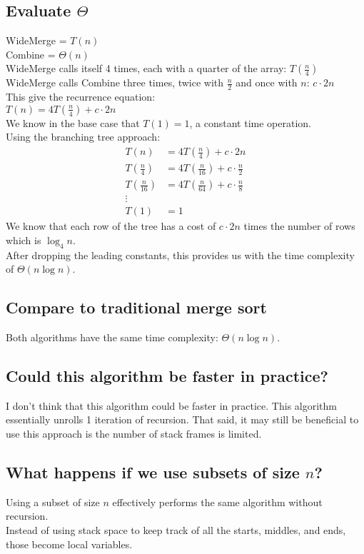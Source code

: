 \documentclass{article}
\begin{document}
\subsection{Evaluate \(\Theta\)}
WideMerge = \(T(n)\) \\
Combine = \(\Theta(n)\) \\
WideMerge calls itself 4 times, each with a quarter of the array: \(T(\frac{n}{4})\) \\
WideMerge calls Combine three times, twice with \(\frac{n}{2}\) and once with \(n\): \(c \cdot 2n\) \\
This give the recurrence equation: \\
\(T(n) = 4T(\frac{n}{4}) + c \cdot 2n\) \\
We know in the base case that \(T(1) = 1\), a constant time operation. \\
Using the branching tree approach: \\
\begin{align}
    T(n) & = 4T(\frac{n}{4}) + c \cdot 2n \\
    T(\frac{n}{4}) & = 4T(\frac{n}{16}) + c \cdot \frac{n}{2} \\
    T(\frac{n}{16}) & = 4T(\frac{n}{64}) + c \cdot \frac{n}{8} \\
    \vdots \\
    T(1) & = 1
\end{align}
We know that each row of the tree has a cost of \(c \cdot 2n\) times the number of rows which is \(\log_4 n\). \\
After dropping the leading constants, this provides us with the time complexity of \(\Theta(n \log n)\).
\subsection{Compare to traditional merge sort}
Both algorithms have the same time complexity: \(\Theta(n \log n)\).
\subsection{Could this algorithm be faster in practice?}
I don't think that this algorithm could be faster in practice.
This algorithm essentially unrolls 1 iteration of recursion.
That said, it may still be beneficial to use this approach is the number of stack frames is limited.
\subsection{What happens if we use subsets of size \(n\)?}
Using a subset of size \(n\) effectively performs the same algorithm without recursion. \\
Instead of using stack space to keep track of all the starts, middles, and ends, those become local variables.
\end{document}
